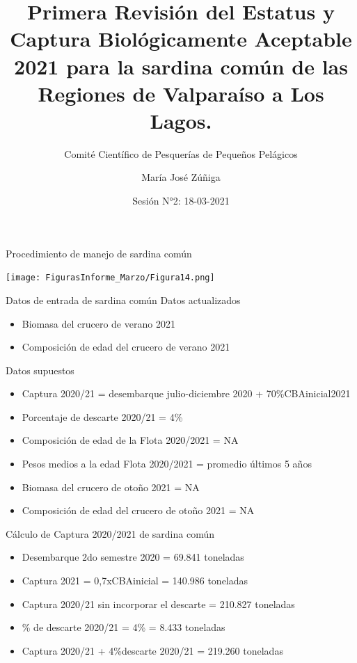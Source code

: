 \documentclass[
  ignorenonframetext,
]{beamer}
\title{Primera Revisión del Estatus y Captura Biológicamente Aceptable
2021 para la sardina común de las Regiones de Valparaíso a Los Lagos.}
\subtitle{Comité Científico de Pesquerías de Pequeños Pelágicos}
\author{María José Zúñiga}
\date{Sesión N°2: 18-03-2021}
\institute{INSTITUTO DE FOMENTO PESQUERO}
\providecommand{\tightlist}{%
  \setlength{\itemsep}{0pt}\setlength{\parskip}{0pt}}
\begin{document}
\frame{\titlepage}

\begin{frame}{Procedimiento de manejo de sardina común}
\protect\hypertarget{procedimiento-de-manejo-de-sardina-comuxfan}{}
\begin{center}
\texttt{[image: FigurasInforme\_Marzo/Figura14.png]}
\end{center}
\end{frame}

\begin{frame}{Datos de entrada de sardina común}
\protect\hypertarget{datos-de-entrada-de-sardina-comuxfan}{}
Datos actualizados

\begin{itemize}
\tightlist
\item
  Biomasa del crucero de verano 2021
\item
  Composición de edad del crucero de verano 2021
\end{itemize}

Datos supuestos

\begin{itemize}
\tightlist
\item
  Captura 2020/21 = desembarque julio-diciembre 2020 +
  70\%CBAinicial2021
\item
  Porcentaje de descarte 2020/21 = 4\%
\item
  Composición de edad de la Flota 2020/2021 = NA
\item
  Pesos medios a la edad Flota 2020/2021 = promedio últimos 5 años
\item
  Biomasa del crucero de otoño 2021 = NA
\item
  Composición de edad del crucero de otoño 2021 = NA
\end{itemize}
\end{frame}

\begin{frame}{Cálculo de Captura 2020/2021 de sardina común}
\protect\hypertarget{cuxe1lculo-de-captura-20202021-de-sardina-comuxfan}{}
\begin{itemize}
\item
  Desembarque 2do semestre 2020 = 69.841 toneladas
\item
  Captura 2021 = 0,7xCBAinicial = 140.986 toneladas
\item
  Captura 2020/21 sin incorporar el descarte = 210.827 toneladas
\item
  \% de descarte 2020/21 = 4\% = 8.433 toneladas
\item
  Captura 2020/21 + 4\%descarte 2020/21 = 219.260 toneladas
\end{itemize}
\end{frame}
\end{document}
